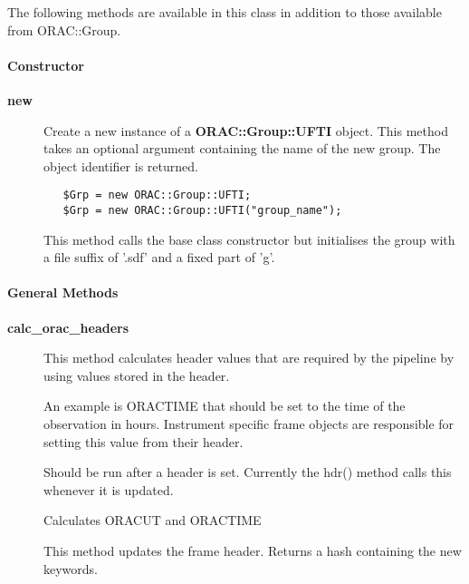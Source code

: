 The following methods are available in this class in addition to
those available from ORAC::Group.

\paragraph*{Constructor\label{ORAC::Group::UFTI_Constructor}}\begin{description}
\item[\textbf{new}] \mbox{}

Create a new instance of a \textbf{ORAC::Group::UFTI} object.
This method takes an optional argument containing the
name of the new group. The object identifier is returned.

\begin{verbatim}
   $Grp = new ORAC::Group::UFTI;
   $Grp = new ORAC::Group::UFTI("group_name");
\end{verbatim}


This method calls the base class constructor but initialises
the group with a file suffix of '.sdf' and a fixed part
of 'g'.

\end{description}
\paragraph*{General Methods\label{ORAC::Group::UFTI_General_Methods}}\begin{description}
\item[\textbf{calc\_orac\_headers}] \mbox{}

This method calculates header values that are required by the
pipeline by using values stored in the header.



An example is ORACTIME that should be set to the time of the
observation in hours. Instrument specific frame objects
are responsible for setting this value from their header.



Should be run after a header is set. Currently the hdr()
method calls this whenever it is updated.



Calculates ORACUT and ORACTIME



This method updates the frame header.
Returns a hash containing the new keywords.

\end{description}
